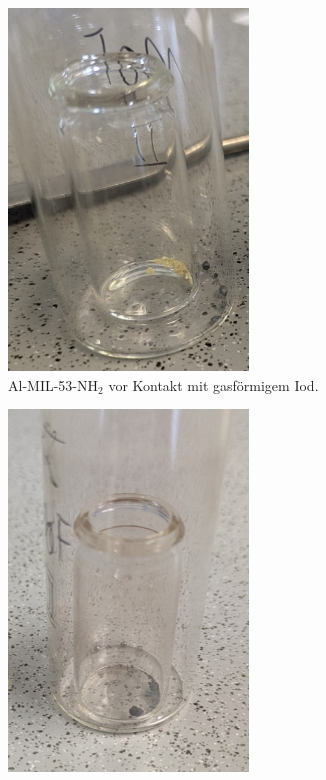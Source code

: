 \documentclass[12pt, a4paper]{article}
\begin{document}
\begin{figure}[h!]
    \centering
    \begin{subfigure}[b]{0.48\textwidth}
        \centering
        \includegraphics[width=0.7\textwidth]{MOF25IIvor.jpg}
        \caption{Al-MIL-53-NH$_2$ vor Kontakt mit gasförmigem Iod.}
        \label{VergleichMOF25IIvor}
    \end{subfigure}
    \hfill
    \begin{subfigure}[b]{0.48\textwidth}
        \centering
        \includegraphics[width=0.7\textwidth]{MOF25IInach.jpg}

\end{subfigure}
\end{figure}
\end{document}
